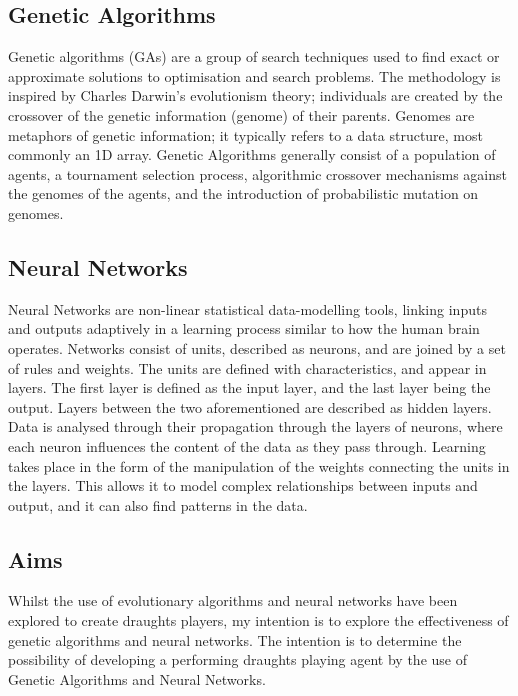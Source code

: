 \documentclass[12pt,a4paper]{article}
\begin{document}
    \subsection*{Genetic Algorithms}

    Genetic algorithms (GAs) are a group of search techniques used to find exact or approximate solutions to optimisation and search problems. The methodology is inspired by Charles Darwin's evolutionism theory; individuals are created by the crossover of the genetic information (genome) of their parents. Genomes are metaphors of genetic information; it typically refers to a data structure, most commonly an 1D array. Genetic Algorithms generally consist of a population of agents, a tournament selection process, algorithmic crossover mechanisms against the genomes of the agents, and the introduction of probabilistic mutation on genomes. 

    \subsection*{Neural Networks}

    Neural Networks are non-linear statistical data-modelling tools, linking inputs and outputs adaptively in a learning process similar to how the human brain operates. Networks consist of units, described as neurons, and are joined by a set of rules and weights. The units are defined with characteristics, and appear in layers. The first layer is defined as the input layer, and the last layer being the output. Layers between the two aforementioned are described as hidden layers. Data is analysed through their propagation through the layers of neurons, where each neuron influences the content of the data as they pass through. Learning takes place in the form of the manipulation of the weights connecting the units in the layers. This allows it to model complex relationships between inputs and output, and it can also find patterns in the data. 

    \subsection*{Aims}

    Whilst the use of evolutionary algorithms and neural networks have been explored to create draughts players, my intention is to explore the effectiveness of genetic algorithms and neural networks. The intention is to determine the possibility of developing a performing draughts playing agent by the use of Genetic Algorithms and Neural Networks.
\end{document}
